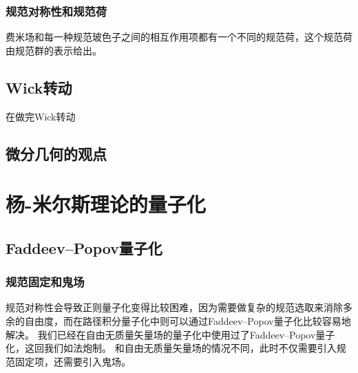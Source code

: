 \documentclass[hyperref, UTF8, a4paper]{ctexart}
\begin{document}
\subsubsection{规范对称性和规范荷}

费米场和每一种规范玻色子之间的相互作用项都有一个不同的规范荷，这个规范荷由规范群的表示给出。

\subsection{Wick转动}

在做完Wick转动

\subsection{微分几何的观点}

\section{杨-米尔斯理论的量子化}

\subsection{Faddeev–Popov量子化}

\subsubsection{规范固定和鬼场}

规范对称性会导致正则量子化变得比较困难，因为需要做复杂的规范选取来消除多余的自由度，而在路径积分量子化中则可以通过Faddeev–Popov量子化比较容易地解决。
我们已经在自由无质量矢量场的量子化中使用过了Faddeev–Popov量子化，这回我们如法炮制。
和自由无质量矢量场的情况不同，此时不仅需要引入规范固定项，还需要引入鬼场。
\end{document}
